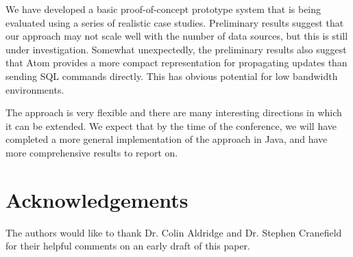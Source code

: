 \documentclass{CRPITStyle}
\begin{document}
We have developed a basic proof-of-concept prototype system that is
being evaluated using a series of realistic case studies. Preliminary
results suggest that our approach may not scale well with the number of
data sources, but this is still under investigation. Somewhat
unexpectedly, the preliminary results also suggest that Atom provides a
more compact representation for propagating updates than sending SQL
commands directly. This has obvious potential for low bandwidth
environments.

The approach is very flexible and there are many interesting directions
in which it can be extended. We expect that by the time of the
conference, we will have completed a more general implementation of the
approach in Java, and have more comprehensive results to report on.



\section*{Acknowledgements}
\label{sec-acknowledgements}

The authors would like to thank Dr. Colin Aldridge and Dr. Stephen
Cranefield for their helpful comments on an early draft of this paper.




\end{document}
